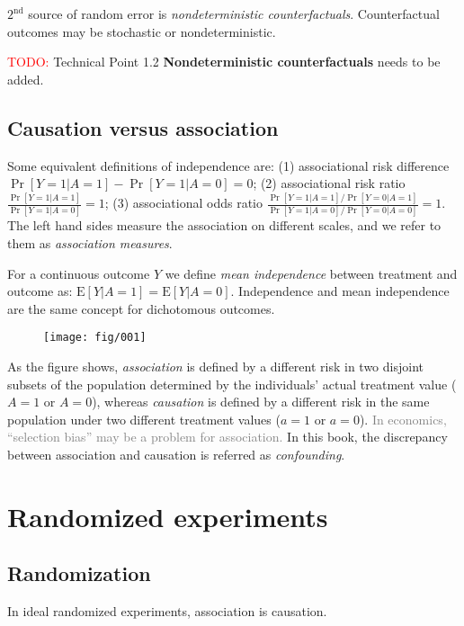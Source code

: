 \documentclass{article}
\begin{document}
$2^{\mathrm{nd}}$ source of random error is \textit{nondeterministic counterfactuals}. Counterfactual outcomes may be stochastic or nondeterministic.

\textcolor{red}{TODO:} Technical Point 1.2 \textbf{Nondeterministic counterfactuals} needs to be added.

\subsection{Causation versus association}
Some equivalent definitions of independence are: (1) associational
risk difference $\operatorname{Pr}[Y=1 | A=1]-\operatorname{Pr}[Y=1 | A=0]=0$; (2) associational risk ratio $\frac{\operatorname{Pr}[Y=1 | A=1]}{\operatorname{Pr}[Y=1 | A=0]}=1$; (3) associational odds ratio $\frac{\operatorname{Pr}[Y=1 | A=1] / \operatorname{Pr}[Y=0 | A=1]}{\operatorname{Pr}[Y=1 | A=0] / \operatorname{Pr}[Y=0 | A=0]}=1$. The left hand sides measure the association on different scales, and we refer to them as \textit{association measures}. 

For a continuous outcome $Y$ we define \textit{mean independence} between treatment and outcome as: $\mathrm{E}[Y | A=1]=\mathrm{E}[Y | A=0]$. Independence and mean independence are the same concept for dichotomous outcomes.

\begin{figure}[h]
		\centering
		\texttt{[image: fig/001]}
\end{figure}

As the figure shows, \textit{association} is defined by a different risk in two disjoint subsets of the population determined by the individuals’ actual treatment value ($A=1$ or $A=0$), whereas \textit{causation} is defined by a different risk in the same population under two different treatment values ($a=1$ or $a=0$). \textcolor{gray}{In economics, ``selection bias'' may be a problem for association.} In this book, the discrepancy between association and causation is referred as \textit{confounding}.


\section{Randomized experiments}
\subsection{Randomization}
In ideal randomized experiments, association is causation.
\end{document}

